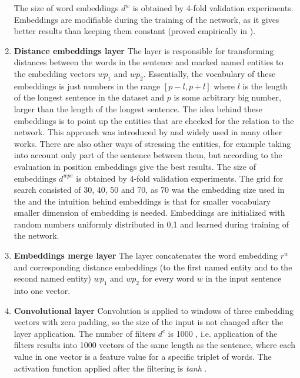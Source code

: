 \begin{enumerate}
 The size of word embeddings $d^w$ is obtained by 4-fold validation experiments. Embeddings are modifiable during the training of the network, as it gives better results than 
 keeping them constant (proved empirically in \cite{DBLP:journals/corr/SantosXZ15}).
  
  \item \textbf{Distance embeddings layer} The layer is responsible for transforming distances between the words in the sentence 
  and marked named entities to the embedding vectors $wp_1$ and $wp_2$. Essentially, the vocabulary of these 
  embeddings is just numbers in the range $[p - l, p + l]$ where $l$ is the length of the 
  longest 
  sentence in the dataset and $p$ is some arbitrary big number, larger than the length of the 
  longest sentence. 
  The idea behind these embeddings is to point up the entities that are checked for the relation 
  to the network. This approach was introduced by \cite{zeng2014relation} and widely used 
  in many other works. There are also other ways of stressing the entities, for example 
  taking into account only part of the sentence between them, but according to the evaluation in  \cite{DBLP:journals/corr/SantosXZ15} position embeddings give the best results.
  The size of embeddings $d^{wpe}$ is obtained by 4-fold validation experiments. The grid for 
  search consisted of 30, 40, 50 and 70, as 70 was the embedding size used in the \cite{DBLP:journals/corr/SantosXZ15} and the intuition behind embeddings is that for smaller 
  vocabulary smaller dimension of embedding is needed. Embeddings are 
  initialized with random numbers uniformly distributed in {0,1} and learned during training of the 
  network.
  
  \item \textbf{Embeddings merge layer} The layer concatenates the word embedding $r^w$ and corresponding 
  distance embeddings (to the first named entity and to the second named entity) $wp_1$ and 
  $wp_2$ for every word $w$
  in the input sentence into one vector.
  
  \item \textbf{Convolutional layer} Convolution is applied to windows of three embedding vectors 
   with zero 
  padding, so the size of the input is not changed after the layer application.
  The number of filters $d^c$ is 1000 \cite{DBLP:journals/corr/SantosXZ15}, i.e. application of the filters 
  results into 1000 vectors of the same 
  length as the sentence, where each value in one vector is a feature value for a specific triplet of 
  words. The activation function applied after the filtering is \textit{tanh} \cite{DBLP:journals/corr/SantosXZ15}.
  

\end{enumerate}
